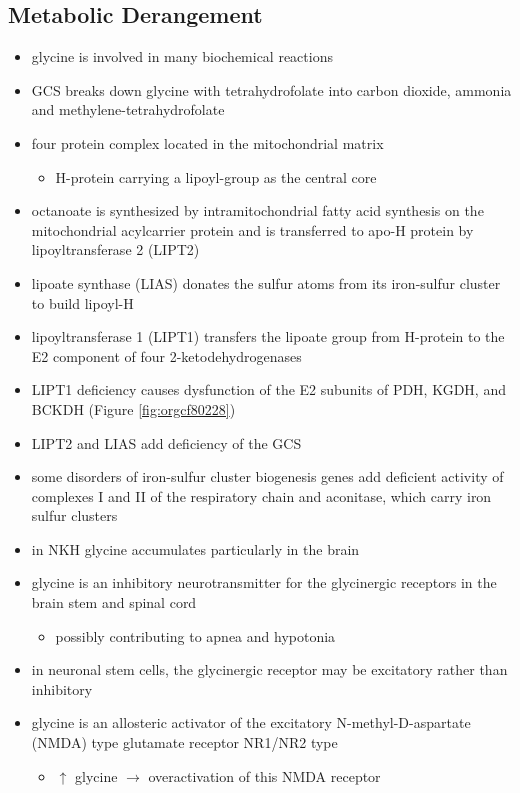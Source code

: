 \documentclass[12pt]{scrartcl}
\begin{document}
\begin{center}
\begin{center}
\subsection{Metabolic Derangement}
\label{sec:orgd69303c}
\begin{itemize}
\item glycine is involved in many biochemical reactions
\item GCS breaks down glycine with tetrahydrofolate into carbon dioxide,
ammonia and methylene-tetrahydrofolate
\item four protein complex located in the mitochondrial matrix
\begin{itemize}
\item H-protein carrying a lipoyl-group as the central core
\end{itemize}
\item octanoate is synthesized by intramitochondrial fatty acid synthesis
on the mitochondrial acylcarrier protein and is transferred to apo-H
protein by lipoyltransferase 2 (LIPT2)
\item lipoate synthase (LIAS) donates the sulfur atoms from its
iron-sulfur cluster to build lipoyl-H
\item lipoyltransferase 1 (LIPT1) transfers the lipoate group from
H-protein to the E2 component of four 2-ketodehydrogenases
\item LIPT1 deficiency causes dysfunction of the E2 subunits of PDH, KGDH,
and BCKDH (Figure \ref{fig:orgcf80228})
\item LIPT2 and LIAS add deficiency of the GCS
\item some disorders of iron-sulfur cluster biogenesis genes add deficient
activity of complexes I and II of the respiratory chain and
aconitase, which carry iron sulfur clusters
\item in NKH glycine accumulates particularly in the brain
\item glycine is an inhibitory neurotransmitter for the glycinergic
receptors in the brain stem and spinal cord
\begin{itemize}
\item possibly contributing to apnea and hypotonia
\end{itemize}
\item in neuronal stem cells, the glycinergic receptor may be excitatory
rather than inhibitory
\item glycine is an allosteric activator of the excitatory
N-methyl-D-aspartate (NMDA) type glutamate receptor NR1/NR2 type
\begin{itemize}
\item \(\uparrow\) glycine \(\to\) overactivation of this NMDA receptor
\end{itemize}
\end{itemize}

\end{center}
\end{center}
\end{document}
